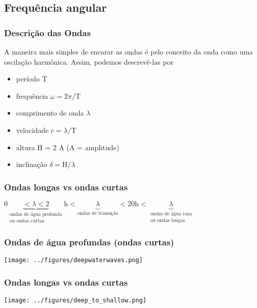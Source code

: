 \documentclass[handout,14pt,xcolor=dvipsnames]{beamer}
\begin{document}
\subsection{Frequência angular}
\begin{frame}
\frametitle{Descrição das Ondas}
    \begin{block}{}
        A maneira mais simples de encarar as ondas é pelo conceito da onda como
        uma oscilação harmônica. Assim, podemos descrevê-las por
    \end{block}
    \begin{itemize}[<+-| alert@+>]
        \item período T
        \item frequência $\omega = 2 \pi / \text{T}$
        \item comprimento de onda $\lambda$
        \item velocidade $c = \lambda / \text{T}$
        \item altura H = 2 A (A = amplitude)
        \item inclinação $\delta = \text{H} / \lambda$
    \end{itemize}
\end{frame}

\begin{frame}
\frametitle{Ondas longas vs ondas curtas}
\small{
\begin{block}{}
$0 \underbrace{< \lambda < 2}_{\substack{\text{ondas de água profunda}\\\text{ou ondas curtas}}} \text{h} < \underbrace{\lambda}_{\text{ondas de transição}} < 20 \text{h} < \underbrace{\lambda}_{\substack{\text{ondas de água rasa}\\\text{ou ondas longas}}}$
\end{block}
}
\end{frame}

\begin{frame}
\frametitle{Ondas de água profundas (ondas curtas)}
    \begin{center}
        \texttt{[image: ../figures/deepwaterwaves.png]}
    \end{center}
\end{frame}

\begin{frame}
\frametitle{Ondas longas vs ondas curtas}
    \begin{center}
        \texttt{[image: ../figures/deep\_to\_shallow.png]}
    \end{center}
\end{frame}
\end{document}
